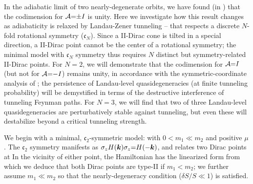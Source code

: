 \documentclass[aps, showpacs, twocolumn, notitlepage, superscriptaddress]{revtex4-1}
\begin{document}

In the adiabatic limit of two nearly-degenerate orbits, we have found (in ) that the codimension for ${\cal A}{=}{\pm} I$ is unity. Here we investigate how this result changes as adiabaticity is relaxed by Landau-Zener tunneling -- that respects a discrete $N$-fold rotational symmetry ($\mathfrak{c}_N$). Since a II-Dirac cone is tilted in a special direction, a II-Dirac point cannot be the center of a rotational symmetry; the minimal model with $\mathfrak{c}_N$ symmetry thus requires $N$ distinct but symmetry-related II-Dirac points. For $N{=}2$, we will demonstrate that the codimension for ${\cal A}{=}I$ (but not for ${\cal A}{=}{-}I$) remains unity, in accordance with the symmetric-coordinate analysis of ; the persistence of  Landau-level quasidegeneracies  (at finite tunneling probability) will be demystified in terms of the destructive interference of tunneling Feynman paths. For $N{=}3$, we will find that two of three Landau-level quasidegeneracies are perturbatively stable against tunneling, but even these will destabilize beyond a critical tunneling strength.

We begin with a minimal, $\mathfrak{c}_2$-symmetric model:
with $0{<}m_1{\ll}m_2$ and positive $\mu$.  The $\mathfrak{c}_2$ symmetry manifests as $\sigma_z H(\boldsymbol{k})\sigma_z{=}H({-}\boldsymbol{k})$, and relates 
two Dirac points at
In the vicinity of either point, the  Hamiltonian has the linearized form 
from which we deduce that both Dirac points are  type-II if $m_1{<}m_2$; we further assume $m_1{\ll}m_2$ so that the nearly-degeneracy condition ($\delta S/S{\ll}1$) is satisfied. 
\end{document}
